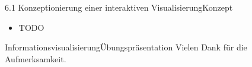 \documentclass[%
11pt,a4paper,xcolor={usenames,dvipsnames}]{beamer}
\begin{document}
    \begin{frame}{6.1 Konzeptionierung einer interaktiven Visualisierung}{Konzept}
        \begin{itemize}
            \item TODO
        \end{itemize}
    \end{frame}   
    
    \begin{frame}{Informationsvisualisierung}{Übungspräsentation}
    	Vielen Dank für die Aufmerksamkeit.
    \end{frame}
\end{document}
